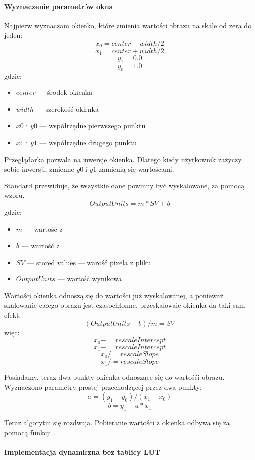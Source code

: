 \paragraph{Wyznaczenie parametrów okna}
\par
Najpierw wyznaczam okienko, które zmienia wartości obrazu na skale od zera do jeden:
\[x_0 = center - width / 2\]
\[x_1 = center + width / 2\]
\[y_1 = 0.0\]
\[y_0 = 1.0\]
gdzie:
\begin{itemize}
    \item $center$ --- środek okienka
    \item $width$ --- szerokość okienka
    \item $x0$ i $y0$ --- współrzędne pierwszego punktu
    \item $x1$ i $y1$ --- współrzędne drugego punktu
\end{itemize}
Przeglądarka pozwala na inwersje okienka.
Dlatego kiedy użytkownik zażyczy sobie inwersji, zmienne $y0$ i $y1$ zamienią się wartoścami.

Standard \DICOM przewiduje, że wszystkie dane powinny być wyskalowane, za pomocą wzoru.
\[OutputUnits = m*SV + b\]
gdzie:
\begin{itemize}
    \item $m$ --- wartość z 
    \item $b$ --- wartość z 
    \item $SV$ --- stored values --- warość pixela z pliku
    \item $OutputUnits$ --- wartość wynikowa
\end{itemize}

Wartości okienka odnoszą się do wartości już wyskalowanej, a ponieważ skalowanie całego obrazu jest czasochłonne, przeskalowaie okienka da taki sam efekt:
\[(OutputUnits - b ) / m = SV \]
więc:
\[x_0 -= rescaleIntercept\]
\[x_1 -= rescaleIntercept\]
\[x_0 /= rescaleSlope\]
\[x_1 /= rescaleSlope\]

Posiadamy, teraz dwa punkty okienka odnoszące się do wartośći obrazu.
Wyznaczono parametry prostej przechodzącej przez dwa punkty:
\[a = (y_1 - y_0) / (x_1 - x_0)\]
\[b = y_1 - a * x_1\]

\par
Teraz algorytm się rozdwaja.
Pobieranie wartości z okienka odbywa się za pomocą funkcji .

\paragraph{Implementacja dynamiczna bez tablicy LUT}

